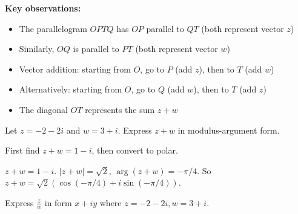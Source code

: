 \begin{solution}[Sketch]
\begin{center}
\end{center}
\vspace{0.5em}

\textbf{Key observations:}
\begin{itemize}[leftmargin=*]
  \item The parallelogram $OPTQ$ has $OP$ parallel to $QT$ (both represent vector $z$)
  \item Similarly, $OQ$ is parallel to $PT$ (both represent vector $w$)
  \item Vector addition: starting from $O$, go to $P$ (add $z$), then to $T$ (add $w$)
  \item Alternatively: starting from $O$, go to $Q$ (add $w$), then to $T$ (add $z$)
  \item The diagonal $OT$ represents the sum $z+w$
\end{itemize}

\end{solution}

\begin{problem}
Let $z = -2-2i$ and $w=3+i$. Express $z+w$ in modulus-argument form.
\end{problem}

\begin{hint}
First find $z+w = 1-i$, then convert to polar.
\end{hint}

\begin{solution}[Sketch]
$z+w = 1-i$. $|z+w| = \sqrt{2}$, $\arg(z+w) = -\pi/4$. So $z+w = \sqrt{2}(\cos(-\pi/4) + i\sin(-\pi/4))$.
\end{solution}

\begin{problem}
Express $\frac{z}{w}$ in form $x+iy$ where $z=-2-2i, w=3+i$.
\end{problem}

